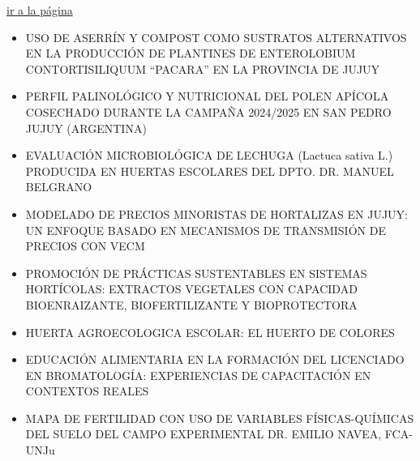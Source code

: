 \documentclass[
  spanish,
  letterpaper,
  DIV=11,
  numbers=noendperiod]{scrreprt}
\begin{document}
\begin{tcolorbox}[enhanced jigsaw, arc=.35mm, colframe=quarto-callout-note-color-frame, opacityback=0, leftrule=.75mm, titlerule=0mm, colbacktitle=quarto-callout-note-color!10!white, breakable, bottomrule=.15mm, colback=white, bottomtitle=1mm, toptitle=1mm, coltitle=black, title={Martes 16}, left=2mm, opacitybacktitle=0.6, toprule=.15mm, rightrule=.15mm]

\href{martes_16.qmd}{ir a la página}

\begin{itemize}
\item
  USO DE ASERRÍN Y COMPOST COMO SUSTRATOS ALTERNATIVOS EN LA PRODUCCIÓN
  DE PLANTINES DE ENTEROLOBIUM CONTORTISILIQUUM ``PACARA'' EN LA
  PROVINCIA DE JUJUY
\item
  PERFIL PALINOLÓGICO Y NUTRICIONAL DEL POLEN APÍCOLA COSECHADO DURANTE
  LA CAMPAÑA 2024/2025 EN SAN PEDRO JUJUY (ARGENTINA)
\item
  EVALUACIÓN MICROBIOLÓGICA DE LECHUGA (Lactuca sativa L.) PRODUCIDA EN
  HUERTAS ESCOLARES DEL DPTO. DR. MANUEL BELGRANO
\item
  MODELADO DE PRECIOS MINORISTAS DE HORTALIZAS EN JUJUY: UN ENFOQUE
  BASADO EN MECANISMOS DE TRANSMISIÓN DE PRECIOS CON VECM
\item
  PROMOCIÓN DE PRÁCTICAS SUSTENTABLES EN SISTEMAS HORTÍCOLAS: EXTRACTOS
  VEGETALES CON CAPACIDAD BIOENRAIZANTE, BIOFERTILIZANTE Y BIOPROTECTORA
\item
  HUERTA AGROECOLOGICA ESCOLAR: EL HUERTO DE COLORES
\item
  EDUCACIÓN ALIMENTARIA EN LA FORMACIÓN DEL LICENCIADO EN BROMATOLOGÍA:
  EXPERIENCIAS DE CAPACITACIÓN EN CONTEXTOS REALES
\item
  MAPA DE FERTILIDAD CON USO DE VARIABLES FÍSICAS-QUÍMICAS DEL SUELO DEL
  CAMPO EXPERIMENTAL DR. EMILIO NAVEA, FCA-UNJu
\end{itemize}

\end{tcolorbox}
\end{document}
